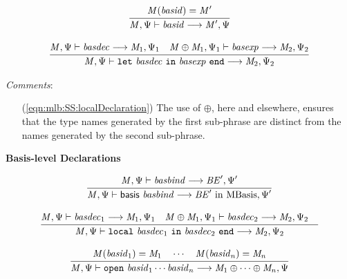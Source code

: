 \documentclass[draft]{article}
\renewcommand{\mit}[1]{\mathit{#1}}
\newcommand{\mrm}[1]{\mathrm{#1}}
\newcommand{\mtt}[1]{\mathtt{#1}}
\newcommand{\msf}[1]{\mathsf{#1}}
\newcommand{\infrule}[2]{{\frac{\displaystyle\strut{#1}}{\displaystyle\strut{#2}}}}
\newcommand{\judge}[2]{\infrule{#1}{#2}}
\begin{document}
\begin{equation}
\judge{
\mit{M}(\mit{basid}) = \mit{M}'
}{
\mit{M}, \Psi \vdash \mit{basid} \longrightarrow \mit{M}', \Psi
}
\end{equation}

\begin{equation}
\label{eqn:mlb:SS:localDeclaration}
\judge{
\mit{M}, \Psi \vdash \mit{basdec} \longrightarrow \mit{M}_1, \Psi_1 \quad
\mit{M} \oplus \mit{M}_1, \Psi_1 \vdash \mit{basexp} \longrightarrow \mit{M}_2, \Psi_2
}{
\mit{M}, \Psi \vdash \mtt{let}~ \mit{basdec} ~\mtt{in}~ \mit{basexp} ~\mtt{end} \longrightarrow \mit{M}_2, \Psi_2
}
\end{equation}

\begin{samepage}
\noindent
\textit{Comments}:
\begin{itemize}
\item[(\ref{eqn:mlb:SS:localDeclaration})] The use of $\oplus$, here
  and elsewhere, ensures that the type names generated by the first
  sub-phrase are distinct from the names generated by the second sub-phrase.
\end{itemize}
\end{samepage}

\vspace{2\parsep}
{\large\noindent
\textbf{Basis-level Declarations} \hfill 
\fbox{$\mit{M}, \Psi \vdash \mit{basdec} \longrightarrow \mit{M}', \Psi'$}
}\nopagebreak

\begin{equation}
\judge{
\mit{M}, \Psi  \vdash \mit{basbind} \longrightarrow \mit{BE}', \Psi'
}{
\mit{M}, \Psi  \vdash \msf{basis}~ \mit{basbind} \longrightarrow \mit{BE}' ~\mrm{in}~ \mrm{MBasis}, \Psi'
}
\end{equation}

\begin{equation}
\judge{
\mit{M}, \Psi  \vdash \mit{basdec}_1 \longrightarrow \mit{M}_1, \Psi_1 \quad
\mit{M} \oplus \mit{M}_1, \Psi_1  \vdash \mit{basdec}_2 \longrightarrow \mit{M}_2, \Psi_2 \quad
}{
\mit{M}, \Psi  \vdash \mtt{local}~ \mit{basdec}_1 ~\mtt{in}~ \mit{basdec}_2 ~\mtt{end} \longrightarrow \mit{M}_2, \Psi_2
}
\end{equation}

\begin{equation}
\judge{
\mit{M}(\mit{basid}_1) = \mit{M}_1 \quad \cdots \quad
\mit{M}(\mit{basid}_n) = \mit{M}_n 
}{
\mit{M}, \Psi  \vdash \mtt{open}~ \mit{basid}_1 \cdots \mit{basid}_n \longrightarrow \mit{M}_1 \oplus \cdots \oplus \mit{M}_n, \Psi
}
\end{equation}
\end{document}
